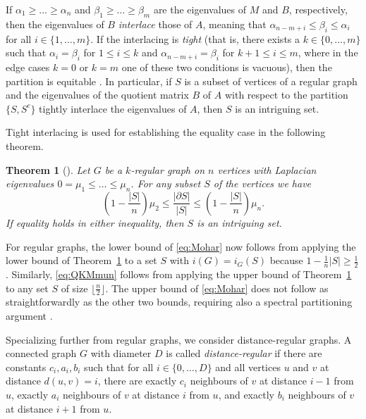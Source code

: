 \documentclass[a4paper,11pt]{article}
\newtheorem{theorem}{Theorem}[section]
\theoremstyle{definition}
\begin{document}
If $\alpha_1\ge \dots \ge \alpha_n$ and $\beta_1\ge \dots \ge \beta_m$ are the eigenvalues of $M$ and $B$, respectively, then the eigenvalues of $B$ \emph{interlace} those of $A$, meaning that $\alpha_{n-m+i} \le\beta_i \le  \alpha_i$ for all $i\in\{1,\dots,m\}$. If the interlacing is \emph{tight} (that is, there exists a $k\in\{0,\dots,m\}$ such that $\alpha_i=\beta_i$ for $1\le i\le k$ and $\alpha_{n-m+i}=\beta_i$ for $k+1\le i \le m$, where in the edge cases $k=0$ or $k=m$ one of these two conditions is vacuous), then the partition is equitable \cite{spectra}. In particular, if $S$ is a subset of vertices of a regular graph and the eigenvalues of the quotient matrix $B$ of $A$ with respect to the partition $\{S,S^c\}$ tightly interlace the eigenvalues of $A$, then $S$ is an intriguing set.


Tight interlacing is used for establishing the equality case in the following theorem.



\begin{theorem}[{\cite[Theorem~3.5]{Haemers1995}}]\label{thm:interlacing}
    Let \(G\) be a \(k\)-regular graph on \(n\) vertices with Laplacian eigenvalues $0=\mu_1\le\dots\le\mu_n$. For any subset \(S\) of the vertices we have
    \[\left(1-\frac{|S|}{n}\right)\mu_2\leq\frac{|\partial S|}{|S|}\leq\left(1-\frac{|S|}{n}\right)\mu_n.
    \]
    If equality holds in either inequality, then $S$ is an intriguing set.
\end{theorem}

For regular graphs, the lower bound of \eqref{eq:Mohar} now follows from applying the lower bound of Theorem~\ref{thm:interlacing} to a set $S$ with $i(G)=i_G(S)$ because $1-\frac1{n}|S| \ge \frac 12$. Similarly, \eqref{eq:QKMmun} follows from applying the upper bound of Theorem~\ref{thm:interlacing} to any set $S$ of size $\lfloor \frac n2\rfloor$. The upper bound of \eqref{eq:Mohar} does not follow as straightforwardly as the other two bounds, requiring also a spectral partitioning argument \cite{M1989}.

Specializing further from regular graphs, we consider distance-regular graphs. A connected graph $G$ with diameter $D$ is called \emph{distance-regular} if there are constants $c_i, a_i, b_i$ such that for all $i\in\{0,\dots,D\}$ and all vertices $u$ and $v$ at distance $d(u, v)=i$, there are exactly $c_i$ neighbours of $v$ at distance $i-1$ from $u$, exactly $a_i$ neighbours of $v$ at distance $i$ from $u$, and exactly $b_i$ neighbours of $v$ at distance $i+1$ from $u$.
\end{document}
